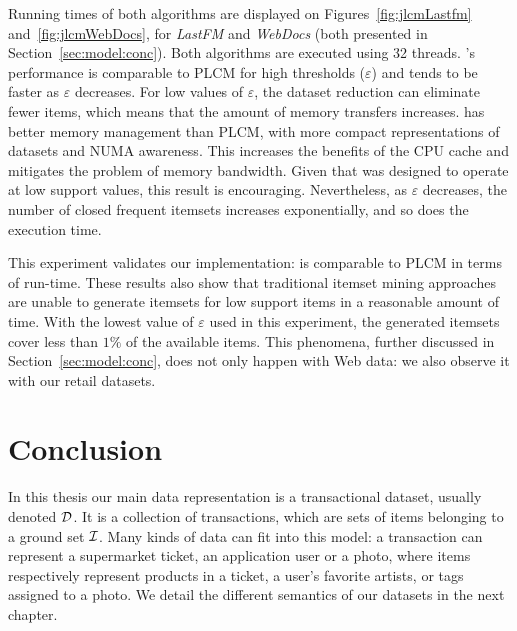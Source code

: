 Running times of both algorithms are displayed on
Figures~\ref{fig:jlcmLastfm} and~\ref{fig:jlcmWebDocs},
for \emph{LastFM} and \emph{WebDocs} (both presented in Section~\ref{sec:model:conc}).
Both algorithms are executed using 32 threads.
\jlcm's performance is comparable to PLCM for high thresholds ($\varepsilon$)
and \jlcm tends to be faster as $\varepsilon$ decreases.
For low values of $\varepsilon$, the dataset reduction can eliminate fewer items,
which means that the amount of memory transfers increases.
\jlcm has better memory management than PLCM, with more compact representations of datasets and NUMA awareness.
This increases the benefits of the CPU cache and mitigates the problem of memory bandwidth.
Given that \jlcm was designed to operate at low support values, this result is encouraging.
Nevertheless, as $\varepsilon$ decreases,
the number of closed frequent itemsets increases exponentially, and so does the execution time.

This experiment validates our implementation:
\jlcm is comparable to PLCM in terms of run-time.
These results also show that traditional itemset mining approaches
are unable to generate itemsets for low support items in a reasonable amount of time.
With the lowest value of $\varepsilon$ used in this experiment,
the generated itemsets cover less than $1\%$ of the available items.
This phenomena, further discussed in Section~\ref{sec:model:conc},
does not only happen with Web data:
we also observe it with our retail datasets.













\section{Conclusion}
\label{sec:rel:conclusion}

In this thesis our main data representation is a transactional dataset,
usually denoted $\cal D$.
It is a collection of transactions, which are sets of items belonging to a ground set $\cal I$.
Many kinds of data can fit into this model:
a transaction can represent a supermarket ticket, an application user or a photo,
where items respectively represent products in a ticket, a user's favorite artists, or tags assigned to a photo.
We detail the different semantics of our datasets in the next chapter.


